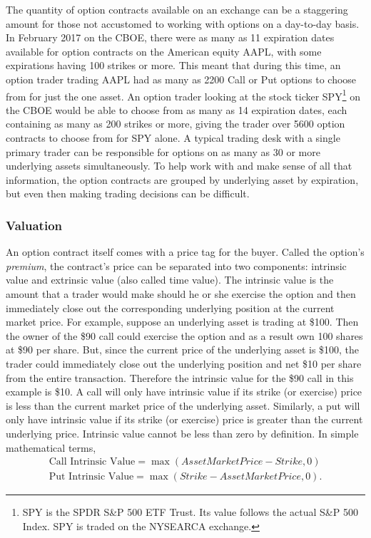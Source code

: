 \documentclass[12pt, a4paper, notitlepage]{article}
\numberwithin{equation}{subsection}
\numberwithin{figure}{subsection}
\numberwithin{table}{subsection}
\newcommand{\newpar}{\newline \newline}
\begin{document}
The quantity of option contracts available on an exchange can be a staggering amount for those not accustomed to working with options on a day-to-day basis.  In February 2017 on the CBOE, there were as many as 11 expiration dates available for option contracts on the American equity AAPL, with some expirations having 100 strikes or more.  This meant that during this time, an option trader trading AAPL had as many as 2200 Call or Put options to choose from for just the one asset.  An option trader looking at the stock ticker SPY\footnote{SPY is the SPDR S\&P 500 ETF Trust.  Its value follows the actual S\&P 500 Index.  SPY is traded on the NYSEARCA exchange.} on the CBOE would be able to choose from as many as 14 expiration dates, each containing as many as 200 strikes or more, giving the trader over 5600 option contracts to choose from for SPY alone.  A typical trading desk with a single primary trader can be responsible for options on as many as 30 or more underlying assets simultaneously.  To help work with and make sense of all that information, the option contracts are grouped by underlying asset by expiration, but even then making trading decisions can be difficult.

\subsubsection{Valuation}
An option contract itself comes with a price tag for the buyer.  Called the option's \textit{premium}, the contract's price can be separated into two components: intrinsic value and extrinsic value (also called time value).
\newpar
The intrinsic value is the amount that a trader would make should he or she exercise the option and then immediately close out the corresponding underlying position at the current market price.  For example, suppose an underlying asset is trading at \$100.  Then the owner of the \$90 call could exercise the option and as a result own 100 shares at \$90 per share.  But, since the current price of the underlying asset is \$100, the trader could immediately close out the underlying position and net \$10 per share from the entire transaction.  Therefore the intrinsic value for the \$90 call in this example is \$10.
\newpar
A call will only have intrinsic value if its strike (or exercise) price is less than the current market price of the underlying asset.  Similarly, a put will only have intrinsic value if its strike (or exercise) price is greater than the current underlying price.  Intrinsic value cannot be less than zero by definition.  In simple mathematical terms,
\begin{equation*}
	\begin{split}
		\text{Call Intrinsic Value} = \max(AssetMarketPrice - Strike, 0) \\
    	\text{Put Intrinsic Value} = \max(Strike - AssetMarketPrice, 0).
	\end{split}
\end{equation*}
\end{document}
